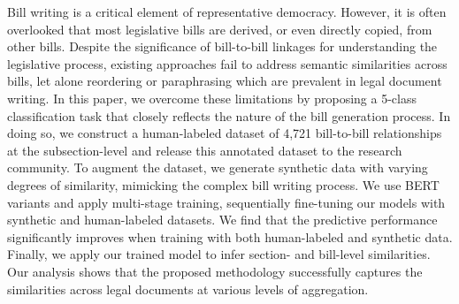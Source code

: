 Bill writing is a critical element of representative democracy. However, it is often overlooked that most legislative bills are derived, or even directly copied, from other bills. Despite the significance of bill-to-bill linkages for understanding the legislative process, existing approaches fail to address semantic similarities across bills, let alone reordering or paraphrasing which are prevalent in legal document writing. In this paper, we overcome these limitations by proposing a 5-class classification task that closely reflects the nature of the bill generation process. In doing so, we construct a human-labeled dataset of 4,721 bill-to-bill relationships at the subsection-level and release this annotated dataset to the research community. To augment the dataset, we generate synthetic data with varying degrees of similarity, mimicking the complex bill writing process. We use BERT variants and apply multi-stage training, sequentially fine-tuning our models with synthetic and human-labeled datasets. We find that the predictive performance significantly improves when training with both human-labeled and synthetic data. Finally, we apply our trained model to infer section- and bill-level similarities. Our analysis shows that the proposed methodology successfully captures the similarities across legal documents at various levels of aggregation.
